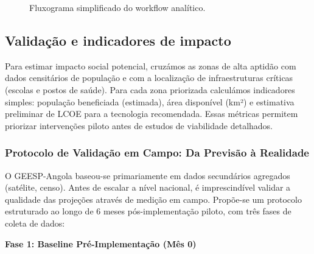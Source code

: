 \documentclass[12pt, a4paper]{article}
\begin{document}
\begin{itemize}
\begin{figure}[H]
\caption{Fluxograma simplificado do workflow analítico.}
\label{fig:fluxograma}
\end{figure}

\subsection{Validação e indicadores de impacto}

Para estimar impacto social potencial, cruzámos as zonas de alta aptidão com dados censitários de população e com a localização de infraestruturas críticas (escolas e postos de saúde). Para cada zona priorizada calculámos indicadores simples: população beneficiada (estimada), área disponível (km²) e estimativa preliminar de LCOE para a tecnologia recomendada. Essas métricas permitem priorizar intervenções piloto antes de estudos de viabilidade detalhados.

\subsubsection{Protocolo de Validação em Campo: Da Previsão à Realidade}

O GEESP-Angola baseou-se primariamente em dados secundários agregados (satélite, censo). 
Antes de escalar a nível nacional, é imprescindível validar a qualidade das projeções 
através de medição em campo. Propõe-se um protocolo estruturado ao longo de 6 meses 
pós-implementação piloto, com três fases de coleta de dados:

\textbf{Fase 1: Baseline Pré-Implementação (Mês 0)}


\end{itemize}
\end{document}
